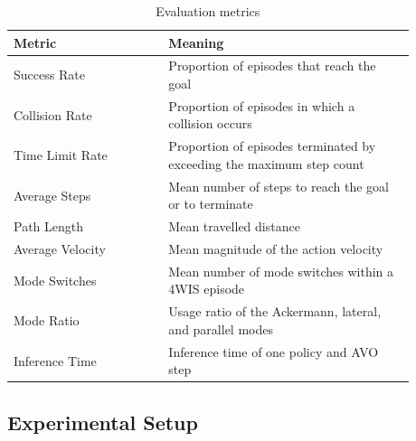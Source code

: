 \documentclass[10pt,a4paper,twocolumn]{article}
\begin{document}
\begin{table}[H]
    \centering

    \caption{Evaluation metrics}
    \label{tab:metrics}
    \small
    \begin{tabular}
{p{0.34\linewidth}p{0.54\linewidth}}
        \toprule

        Metric & Meaning \\
        \midrule

        Success Rate & Proportion of episodes that reach the goal \\
        Collision Rate & Proportion of episodes in which a collision occurs \\
        Time Limit Rate & Proportion of episodes terminated by exceeding the maximum step count \\
        Average Steps & Mean number of steps to reach the goal or to terminate \\
        Path Length & Mean travelled distance \\
        Average Velocity & Mean magnitude of the action velocity \\
        Mode Switches & Mean number of mode switches within a 4WIS episode \\
        Mode Ratio & Usage ratio of the Ackermann, lateral, and parallel modes \\
        Inference Time & Inference time of one policy and AVO step \\
        \bottomrule

    
\end{tabular}
\end{table}

\subsection{Experimental Setup}
\end{document}
